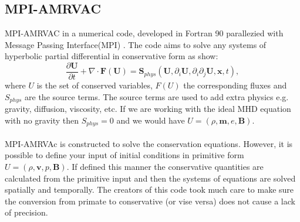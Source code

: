 \documentclass[12pt]{ociamthesis}
\begin{document}
\subsection{MPI-AMRVAC}
MPI-AMRVAC in a numerical code, developed in Fortran 90 parallezied with Message Passing Interface(MPI) \citep{Keppens_2012}. The code aims to solve any systems of hyperbolic partial differential in conservative form as show: 
\begin{equation}\label{AMRVAC_stlye}
\frac{\partial \boldsymbol{U}}{\partial t} + \nabla \cdot \boldsymbol{F}(\boldsymbol{U}) = \boldsymbol{S}_{phys} (\boldsymbol{U}, \partial_{i} \boldsymbol{U}, \partial_i \partial_j \boldsymbol{U},\boldsymbol{x},t) ,
\end{equation}
where $U$ is the set of conserved variables, $F(U)$ the corresponding fluxes and $S_{phys}$ are the source terms. The source terms are used to add extra physics e.g. gravity, diffusion, viscosity, etc. If we are working with the ideal MHD equation with no gravity then $S_{phys} = $0 and we would have $U=(\rho, \boldsymbol{m}, e, \boldsymbol{B})$. \\ \\ MPI-AMRVAc is constructed to solve the conservation equations. However, it is possible to define your input of initial conditions in primitive form $U = (\rho, \boldsymbol{v}, p, \boldsymbol{B})$. If defined this manner the conservative quantities are calculated from the primitive input and then the systems of equations are solved spatially and temporally. The creators of this code took much care to make sure the conversion from primate to conservative (or vise versa) does not cause a lack of precision. \\ \\      
\end{document}

